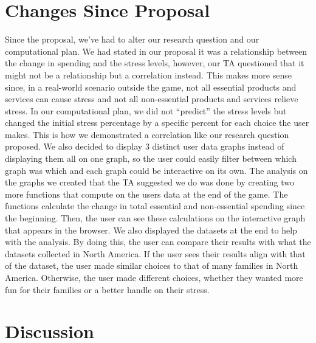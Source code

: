 \documentclass[fontsize=11pt]{article}
\begin{document}
    \section*{Changes Since Proposal}

    Since the proposal, we’ve had to alter our research question and our computational plan. We had stated in our proposal it was a relationship between the change in spending and the stress levels, however, our TA questioned that it might not be a relationship but a correlation instead. This makes more sense since, in a real-world scenario outside the game, not all essential products and services can cause stress and not all non-essential products and services relieve stress. In our computational plan, we did not “predict” the stress levels but changed the initial stress percentage by a specific percent for each choice the user makes. This is how we demonstrated a correlation like our research question proposed. We also decided to display 3 distinct user data graphs instead of displaying them all on one graph, so the user could easily filter between which graph was which and each graph could be interactive on its own. The analysis on the graphs we created that the TA suggested we do was done by creating two more functions that compute on the users data at the end of the game. The functions calculate the change in total essential and non-essential spending since the beginning. Then, the user can see these calculations on the interactive graph that appears in the browser. We also displayed the datasets at the end to help with the analysis. By doing this, the user can compare their results with what the datasets collected in North America. If the user sees their results align with that of the dataset, the user made similar choices to that of many families in North America. Otherwise, the user made different choices, whether they wanted more fun for their families or a better handle on their stress.

    \section*{Discussion}
\end{document}
